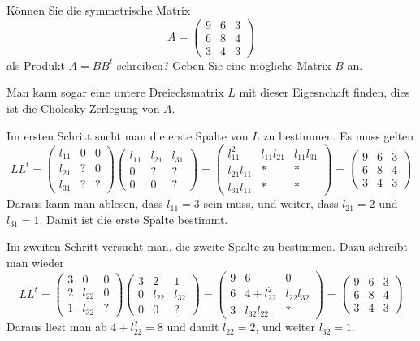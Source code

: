 Können Sie die symmetrische Matrix
\[
A=\begin{pmatrix}
9&6&3\\
6&8&4\\
3&4&3
\end{pmatrix}
\]
als Produkt $A=BB^t$ schreiben? Geben Sie eine mögliche Matrix $B$ an.

\begin{loesung}
Man kann sogar eine untere Dreiecksmatrix $L$ mit dieser Eigesnchaft finden,
dies ist die Cholesky-Zerlegung von $A$.

Im ersten Schritt sucht man die erste Spalte von $L$ zu bestimmen.
Es muss gelten
\[
LL^t=
\begin{pmatrix}
l_{11}&  0&  0\\
l_{21}&  ?&  0\\
l_{31}&  ?&  ?
\end{pmatrix}
\begin{pmatrix}
l_{11}&l_{21}&l_{31}\\
     0&     ?&     ?\\
     0&     0&     ?
\end{pmatrix}
=
\begin{pmatrix}
    l_{11}^2&l_{11}l_{21}&l_{11}l_{31}\\
l_{21}l_{11}&           *&           *\\
l_{31}l_{11}&           *&           *
\end{pmatrix}
=
\begin{pmatrix}
9&6&3\\
6&8&4\\
3&4&3
\end{pmatrix}
\]
Daraus kann man ablesen, dass $l_{11}=3$ sein muss, und weiter,
dass
$l_{21}=2$ und $l_{31}=1$. Damit ist die erste Spalte bestimmt.

Im zweiten Schritt versucht man, die zweite Spalte zu bestimmen.
Dazu schreibt man wieder
\[
LL^t
=
\begin{pmatrix}
3&     0&0\\
2&l_{22}&0\\
1&l_{32}&?
\end{pmatrix}
\begin{pmatrix}
3&     2&     1\\
0&l_{22}&l_{32}\\
0&     0&?
\end{pmatrix}
=
\begin{pmatrix}
9&6           &           0\\
6&4+l_{22}^2  &l_{22}l_{32}\\
3&l_{32}l_{22}&         *
\end{pmatrix}
=
\begin{pmatrix}
9&6&3\\
6&8&4\\
3&4&3
\end{pmatrix}
\]
Daraus liest man ab $4+l_{22}^2=8$ und damit $l_{22}=2$, und weiter
$l_{32}=1$.


\end{loesung}
